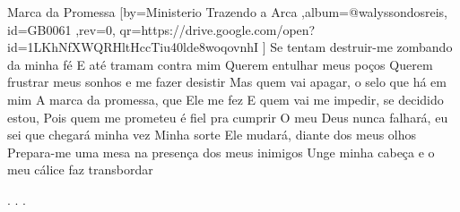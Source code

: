 \beginsong
{Marca da Promessa %
}[by={Ministerio Trazendo a Arca %
},album={@walyssondosreis},
id={GB0061 %
},rev={0}, %
qr={https://drive.google.com/open?id=1LKhNfXWQRHltHccTiu40lde8woqovnhI %
}]
\beginverse*
Se tentam destruir-me zombando da minha fé
E até tramam contra mim
Querem entulhar meus poços
Querem frustrar meus sonhos e me fazer desistir
\endverse
\beginverse*
Mas quem vai apagar, o selo que há em mim
A marca da promessa, que Ele me fez
E quem vai me impedir, se decidido estou,
Pois quem me prometeu é fiel pra cumprir
\endverse
\beginchorus
O meu Deus nunca falhará, eu sei que chegará minha vez
Minha sorte Ele mudará, diante dos meus olhos
\endchorus
\beginverse*
Prepara-me uma mesa na presença dos meus inimigos
Unge minha cabeça e o meu cálice faz transbordar
\endverse


\beginverse*\color{white}
.
.
.
\endverse
\begin{comment}
\lstset{basicstyle=\scriptsize\bf} %
\tab{Solo 1}
\begin{lstlisting}
E|-----------------------------------------------------|
B|-----------------------------------------------------|
G|-----------------------------------------------------|
D|-----------------------------------------------------|
A|-----------------------------------------------------|
E|-----------------------------------------------------|
\end{lstlisting}
\end{comment}
 
